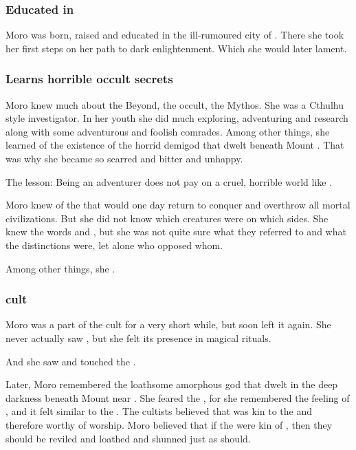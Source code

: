 \subsubsection{Educated in \Yormis}
Moro was born, raised and educated in the ill-rumoured city of . 
There she took her first steps on her path to dark enlightenment.
Which she would later lament.





\subsubsection{Learns horrible occult secrets}
Moro \Cornel knew much about the Beyond, the occult, the \Miith Mythos. 
She was a Cthulhu style investigator. 
In her youth she did much exploring, adventuring and research along with some adventurous and foolish comrades. 
Among other things, she learned of the existence of the horrid demigod  that dwelt beneath Mount \Shrun. 
That was why she became so scarred and bitter and unhappy. 

The lesson: Being an adventurer does not pay on a cruel, horrible world like \Miith.

Moro knew of the  that would one day return to conquer \Miith and overthrow all mortal civilizations. 
But she did not know which creatures were on which sides. 
She knew the words \quo{\xs} and \quo{\bane}, but she was not quite sure what they referred to and what the distinctions were, let alone who opposed whom. 

Among other things, she .





\subsubsection{\Ubloth cult}
Moro was a part of the  cult for a very short while, but soon left it again.
She never actually saw \Ubloth, but she felt its presence in magical rituals. 

And she saw and touched the . 

Later, Moro remembered the loathsome amorphous god \Ubloth that dwelt in the deep darkness beneath Mount \Shrun near \Yormis. 
She feared the \Primordials, for she remembered the feeling of \Ubloth, and it felt similar to the \Primordials.
The \Ubloth cultists believed that \Ubloth was kin to the \Primordials and therefore worthy of worship.
Moro believed that if the \Primordials were kin of \Ubloth, then they should be reviled and loathed and shunned just as \Ubloth should. 






